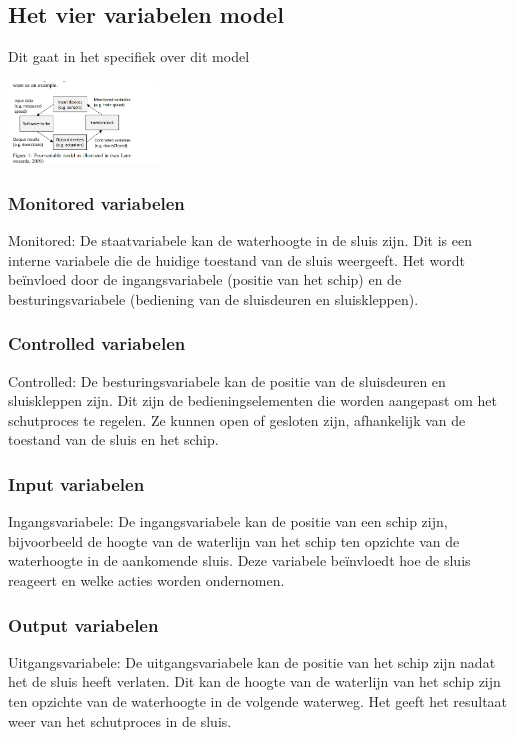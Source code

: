 \documentclass{article}
\begin{document}
	\subsection{Het vier variabelen model}
	Dit gaat in het specifiek  over  dit model
	
	\includegraphics[width=4cm]{4varmodel.png} %
	\subsubsection{Monitored variabelen}
	Monitored: De staatvariabele kan de waterhoogte in de sluis zijn. Dit is een interne variabele die de huidige toestand van de sluis weergeeft. Het wordt beïnvloed door de ingangsvariabele (positie van het schip) en de besturingsvariabele (bediening van de sluisdeuren en sluiskleppen).
	\subsubsection{Controlled variabelen}
		Controlled: De besturingsvariabele kan de positie van de sluisdeuren en sluiskleppen zijn. Dit zijn de bedieningselementen die worden aangepast om het schutproces te regelen. Ze kunnen open of gesloten zijn, afhankelijk van de toestand van de sluis en het schip.
	\subsubsection{Input variabelen}
	Ingangsvariabele: De ingangsvariabele kan de positie van een schip zijn, bijvoorbeeld de hoogte van de waterlijn van het schip ten opzichte van de waterhoogte in de aankomende sluis. Deze variabele beïnvloedt hoe de sluis reageert en welke acties worden ondernomen.
	\subsubsection{Output variabelen}
	Uitgangsvariabele: De uitgangsvariabele kan de positie van het schip zijn nadat het de sluis heeft verlaten. Dit kan de hoogte van de waterlijn van het schip zijn ten opzichte van de waterhoogte in de volgende waterweg. Het geeft het resultaat weer van het schutproces in de sluis.

	
	
	
	
\end{document}
